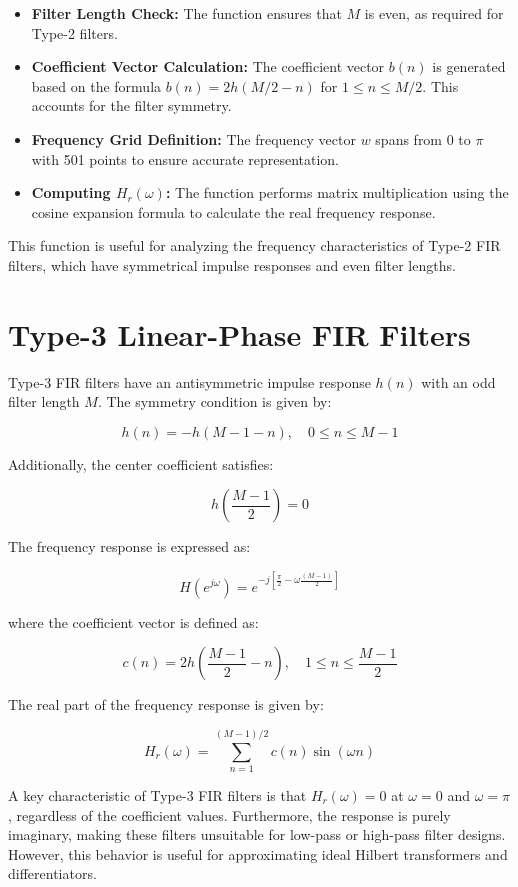 \documentclass[a4paper,12pt]{article}
\begin{document}
\begin{itemize}
    \item \textbf{Filter Length Check:} The function ensures that \( M \) is even, as required for Type-2 filters.
    
    \item \textbf{Coefficient Vector Calculation:} The coefficient vector \( b(n) \) is generated based on the formula \( b(n) = 2h(M/2 - n) \) for \( 1 \leq n \leq M/2 \). This accounts for the filter symmetry.

    \item \textbf{Frequency Grid Definition:} The frequency vector \( w \) spans from 0 to \( \pi \) with 501 points to ensure accurate representation.

    \item \textbf{Computing \( H_r(\omega) \):} The function performs matrix multiplication using the cosine expansion formula to calculate the real frequency response.

\end{itemize}

This function is useful for analyzing the frequency characteristics of Type-2 FIR filters, which have symmetrical impulse responses and even filter lengths.
\section{Type-3 Linear-Phase FIR Filters}

Type-3 FIR filters have an antisymmetric impulse response \( h(n) \) with an odd filter length \( M \). The symmetry condition is given by:

\[
h(n) = -h(M-1-n), \quad 0 \leq n \leq M-1
\]

Additionally, the center coefficient satisfies:

\[
h\left(\frac{M-1}{2}\right) = 0
\]

The frequency response is expressed as:

\[
H(e^{j\omega}) = e^{-j\left[\frac{\pi}{2} - \omega \frac{(M-1)}{2} \right]}
\]

where the coefficient vector is defined as:

\[
c(n) = 2h\left(\frac{M-1}{2} - n\right), \quad 1 \leq n \leq \frac{M-1}{2}
\]

The real part of the frequency response is given by:

\[
H_r(\omega) = \sum_{n=1}^{(M-1)/2} c(n) \sin(\omega n)
\]

A key characteristic of Type-3 FIR filters is that \( H_r(\omega) = 0 \) at \( \omega = 0 \) and \( \omega = \pi \), regardless of the coefficient values. Furthermore, the response is purely imaginary, making these filters unsuitable for low-pass or high-pass filter designs. However, this behavior is useful for approximating ideal Hilbert transformers and differentiators.
\end{document}

